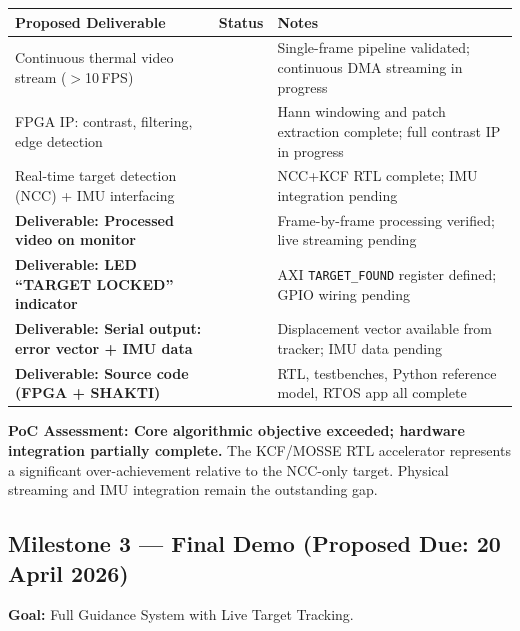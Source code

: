 \documentclass[12pt,a4paper]{article}
\newcommand{\chk}{\textcolor{StatusGreen}{\ding{52}}}
\newcommand{\prt}{\textcolor{StatusAmber}{\ding{119}}}
\newcommand{\pnd}{\textcolor{StatusRed}{\ding{54}}}
\begin{document}
\begin{center}
\begin{tabularx}{\linewidth}{L{5.5cm} C{1.6cm} X}
\toprule
{}
\textbf{Proposed Deliverable} & \textbf{Status} & \textbf{Notes} \\
\midrule
Continuous thermal video stream ($>$10\,FPS) & \prt & Single-frame pipeline validated; continuous DMA streaming in progress \\
FPGA IP: contrast, filtering, edge detection & \prt & Hann windowing and patch extraction complete; full contrast IP in progress \\
Real-time target detection (NCC) + IMU interfacing & \prt & NCC+KCF RTL complete; IMU integration pending \\
\textbf{Deliverable: Processed video on monitor} & \prt & Frame-by-frame processing verified; live streaming pending \\
\textbf{Deliverable: LED ``TARGET LOCKED'' indicator} & \pnd & AXI \texttt{TARGET\_FOUND} register defined; GPIO wiring pending \\
\textbf{Deliverable: Serial output: error vector + IMU data} & \pnd & Displacement vector available from tracker; IMU data pending \\
\textbf{Deliverable: Source code (FPGA + SHAKTI)} & \chk & RTL, testbenches, Python reference model, RTOS app all complete \\
\bottomrule
\end{tabularx}
\end{center}

\medskip
\textbf{PoC Assessment: Core algorithmic objective exceeded; hardware integration partially complete.} The KCF/MOSSE RTL accelerator represents a significant over-achievement relative to the NCC-only target. Physical streaming and IMU integration remain the outstanding gap.

\subsection{Milestone 3 --- Final Demo (Proposed Due: 20 April 2026)}

\textbf{Goal:} Full Guidance System with Live Target Tracking.
\end{document}
